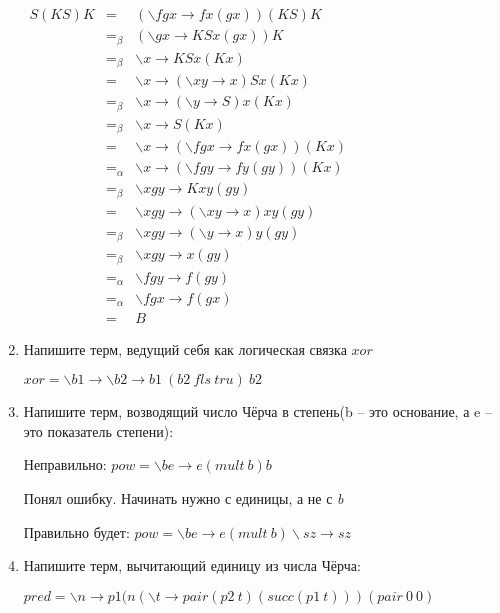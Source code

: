 \documentclass[fontsize=14pt, paper=a4, pagesize, DIV=calc]{article}
\newcommand{\lam}[2]{\backslash #1 \rightarrow #2}
\begin{document}
\begin{enumerate}
$\begin{array}{lcl} 
S (K S) K & = & (\lam{fgx}{f x (g x)}) (K S) K \\ 
          & =_{\beta} & (\lam{gx}{K S x (g x)}) K \\ 
          & =_{\beta} & \lam{x}{K S x (K x)} \\ 
          & = & \lam{x}{(\lam{xy}{x}) S x (K x)} \\ 
          & =_{\beta} & \lam{x}{(\lam{y}{S}) x (K x)} \\ 
          & =_{\beta} & \lam{x}{S (K x)} \\ 
          & = & \lam{x}{(\lam{f g x}{f x(g x)}) (K x)} \\ 
          & =_{\alpha} & \lam{x}{(\lam{f g y}{f y(g y)}) (K x)} \\ 
          & =_{\beta} & \lam{xgy}{K x y (g y)} \\ 
          & = & \lam{xgy}{(\lam{xy}{x}) x y (g y)} \\ 
          & =_{\beta} & \lam{xgy}{(\lam{y}{x}) y (g y)} \\ 
          & =_{\beta} & \lam{xgy}{x (g y)} \\ 
          & =_{\alpha} & \lam{fgy}{f (g y)} \\ 
          & =_{\alpha} & \lam{fgx}{f (g x)} \\ 
          & = & B
\end{array}$

\item Напишите терм, ведущий себя как логическая связка $xor$

$xor = \lam{b1}{\lam{b2}{b1\ (b2\ fls\ tru)\ b2}}$

\item Напишите терм, возводящий число Чёрча в степень(b – это основание, 
а e – это показатель степени):

Неправильно: $pow = \lam{be}{e (mult\ b) b}$ 

Понял ошибку. Начинать нужно с единицы, а не с {\it b}

Правильно будет: $pow = \lam{be}{e (mult\ b) \lam{sz}{sz}}$

\item Напишите терм, вычитающий единицу из числа Чёрча:

$pred = \lam{n}{p1(n (\lam{t}{pair (p2\ t) (succ (p1\ t))}) (pair\ 0\ 0)} $

\end{enumerate}
\end{document}
